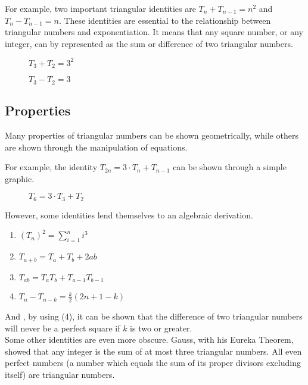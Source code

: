 \documentclass{article}
\begin{document}
For example, two important triangular identities are $T_n + T_{n-1} = n^2$ and $T_n - T_{n-1} = n$. These identities are essential to the relationship between triangular numbers and exponentiation. It means that any square number, or any integer, can by represented as the sum or difference of two triangular numbers.

\begin{figure}[H]
\centering

\caption{$T_3 + T_2 = 3^2$\label{tnplustnminus1l}}
\end{figure}
\begin{figure}[H]
\centering

\caption{$T_3 - T_2 = 3$\label{tnminustnminus1l}}
\end{figure}


\subsection{Properties}

Many properties of triangular numbers can be shown geometrically, while others are shown through the manipulation of equations.

For example, the identity $T_{2n} = 3\cdot T_n + T_{n-1}$ can be shown through a simple graphic.
\begin{figure}[H]
\centering

\caption{$T_{6} = 3 \cdot T_3 + T_2$\label{T2n}}
\end{figure}

However, some identities  lend themselves to an algebraic derivation.

\begin{enumerate}
  \item $(T_n)^2 = \sum_{i=1}^n i^3$
  \item $T_{a+b} = T_a + T_b + 2ab$
  \item $T_{ab} = T_a T_b + T_{a-1}T_{b-1}$
  \item $T_n - T_{n-k} = \frac{k}{2} (2n + 1 - k)$
\end{enumerate}

And , by using (4), it can be shown that the difference of two triangular numbers will never be a perfect square if $k$ is two or greater.\\

Some other identities are even more obscure. Gauss, with his Eureka Theorem, showed that any integer is the sum of at most three triangular numbers. All even perfect numbers (a number which equals the sum of its proper divisors excluding itself) are triangular numbers.
\end{document}
